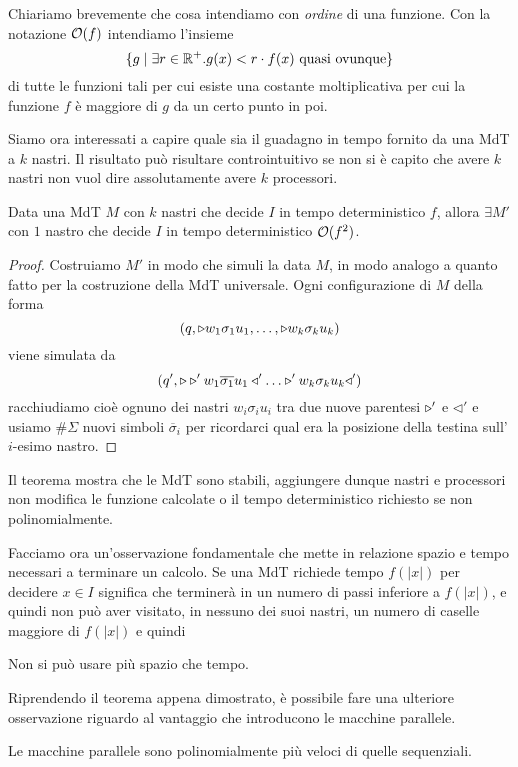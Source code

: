 Chiariamo brevemente che cosa intendiamo con \emph{ordine} di
una funzione. Con la notazione $\mathcal{O}(f)$ intendiamo l'insieme
\[
	\{ g \mid \exists r \in \mathbb{R}^+ . g(x) < r \cdot f(x)
	\text{ quasi ovunque} \}
\]
di tutte le funzioni tali per cui esiste una costante
moltiplicativa per cui la funzione $f$ è maggiore di $g$
da un certo punto in poi.

Siamo ora interessati a capire quale sia il guadagno in tempo
fornito da una MdT a $k$ nastri. Il risultato può risultare
controintuitivo se non si è capito che avere $k$ nastri non
vuol dire assolutamente avere $k$ processori.

\begin{theorem} \label{th: red_nastri}
	Data una MdT $M$ con $k$ nastri che decide $I$ in tempo
	deterministico $f$, allora $\exists M'$ con $1$ nastro che
	decide $I$ in tempo deterministico $\mathcal{O} (f^2)$.
	\begin{proof}
		Costruiamo $M'$ in modo che simuli la data $M$, in modo
		analogo a quanto fatto per la costruzione della MdT
		universale. Ogni configurazione di $M$ della forma
		\[
			(q, \triangleright w_1 \sigma_1 u_1, \dots,
			\triangleright w_k \sigma_k u_k )
		\]
		viene simulata da
		\[
			(q', \start \start' w_1 \overline{\sigma_1} u_1
			\triangleleft' \dots
			\start' w_k \sigma_k u_k \triangleleft')
		\]
		racchiudiamo cioè ognuno dei nastri $w_i \sigma_i u_i$
		tra due nuove parentesi $\triangleright'$ e $\triangleleft'$ e
		usiamo $\# \Sigma$ nuovi simboli $\overline{\sigma}_i$
		per ricordarci qual era la posizione della testina
		sull'$i$-esimo nastro.

	\end{proof}
\end{theorem}

Il teorema mostra che le MdT sono stabili, aggiungere dunque
nastri e processori non modifica le funzione calcolate o il
tempo deterministico richiesto se non polinomialmente.

Facciamo ora un'osservazione fondamentale che mette in relazione
spazio e tempo necessari a terminare un calcolo. Se una MdT
richiede tempo $f(|x|)$ per decidere $x \in I$ significa che
terminerà in un numero di passi inferiore a $f(|x|)$, e quindi
non può aver visitato, in nessuno dei suoi nastri, un numero di
caselle maggiore di $f(|x|)$ e quindi

\begin{observation}
	Non si può usare più spazio che tempo.
\end{observation}

Riprendendo il teorema appena dimostrato, è possibile fare una
ulteriore osservazione riguardo al vantaggio che introducono le
macchine parallele.

\begin{corollary}
	Le macchine parallele sono polinomialmente più veloci di
	quelle sequenziali.
\end{corollary}